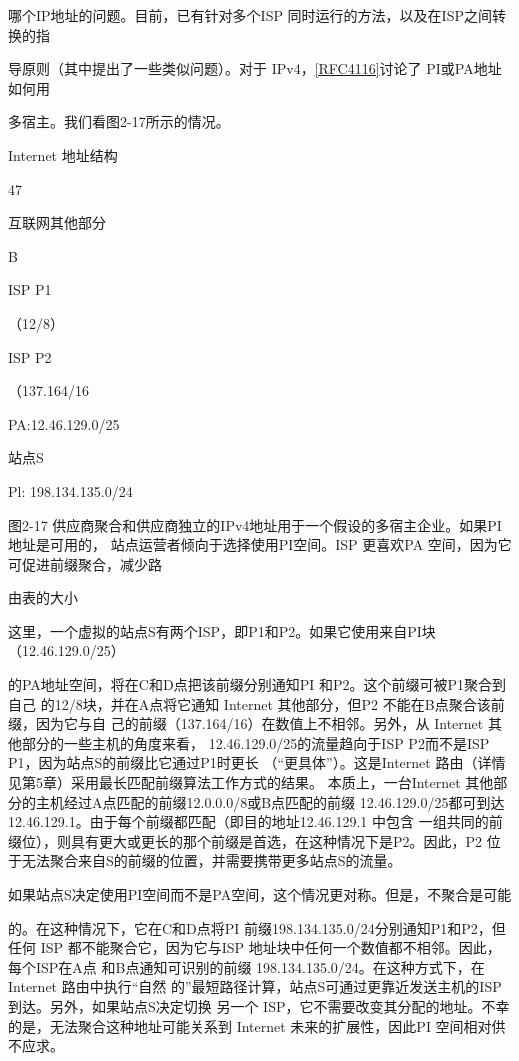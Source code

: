哪个IP地址的问题。目前，已有针对多个ISP 同时运行的方法，以及在ISP之间转换的指

导原则（其中提出了一些类似问题）。对于 IPv4，\href{https://www.rfc-editor.org/rfc/rfc4116}{[RFC4116]}讨论了 PI或PA地址如何用

多宿主。我们看图2-17所示的情况。

Internet 地址结构

47

互联网其他部分

B

ISP P1

（12/8）

ISP P2

（137.164/16

PA:12.46.129.0/25

站点S

Pl: 198.134.135.0/24

图2-17 供应商聚合和供应商独立的IPv4地址用于一个假设的多宿主企业。如果PI 地址是可用的，
站点运营者倾向于选择使用PI空间。ISP 更喜欢PA 空间，因为它可促进前缀聚合，减少路

由表的大小

这里，一个虚拟的站点S有两个ISP，即P1和P2。如果它使用来自PI块（12.46.129.0/25）

的PA地址空间，将在C和D点把该前缀分别通知PI 和P2。这个前缀可被P1聚合到自己
的12/8块，并在A点将它通知 Internet 其他部分，但P2 不能在B点聚合该前缀，因为它与自
己的前缀（137.164/16）在数值上不相邻。另外，从 Internet 其他部分的一些主机的角度来看，
12.46.129.0/25的流量趋向于ISP P2而不是ISP P1，因为站点S的前缀比它通过P1时更长
（“更具体”）。这是Internet 路由（详情见第5章）采用最长匹配前缀算法工作方式的结果。
本质上，一台Internet 其他部分的主机经过A点匹配的前缀12.0.0.0/8或B点匹配的前缀
12.46.129.0/25都可到达12.46.129.1。由于每个前缀都匹配（即目的地址12.46.129.1 中包含
一组共同的前缀位），则具有更大或更长的那个前缀是首选，在这种情况下是P2。因此，P2
位于无法聚合来自S的前缀的位置，并需要携带更多站点S的流量。

如果站点S决定使用PI空间而不是PA空间，这个情况更对称。但是，不聚合是可能

的。在这种情况下，它在C和D点将PI 前缀198.134.135.0/24分别通知P1和P2，但任何
ISP 都不能聚合它，因为它与ISP 地址块中任何一个数值都不相邻。因此，每个ISP在A点
和B点通知可识别的前缀 198.134.135.0/24。在这种方式下，在Internet 路由中执行“自然
的”最短路径计算，站点S可通过更靠近发送主机的ISP 到达。另外，如果站点S决定切换
另一个 ISP，它不需要改变其分配的地址。不幸的是，无法聚合这种地址可能关系到 Internet
未来的扩展性，因此PI 空间相对供不应求。

